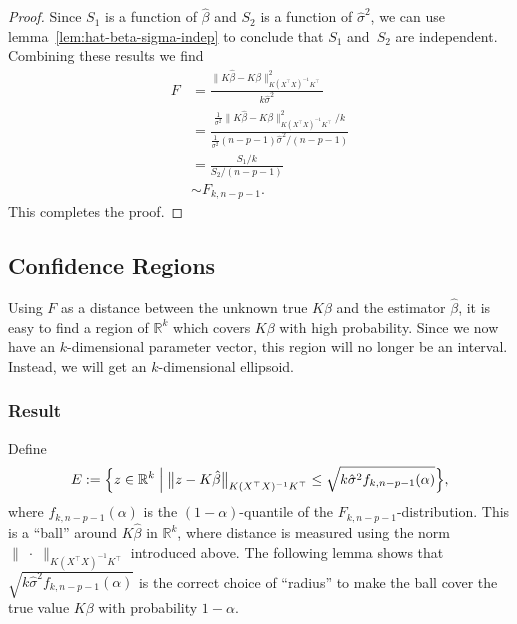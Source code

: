 \documentclass[
  a4paper,
]{article}
\theoremstyle{definition}
\theoremstyle{definition}
\theoremstyle{definition}
\theoremstyle{definition}
\theoremstyle{remark}
\begin{document}
\begin{proof}
Since \(S_1\) is a function of \(\hat\beta\) and \(S_2\) is a function of
\(\hat\sigma^2\), we can use lemma~\ref{lem:hat-beta-sigma-indep} to
conclude that \(S_1\) and~\(S_2\) are independent.
Combining these results we find
\begin{align*}
  F
  &= \frac{\bigl\| K \hat\beta - K \beta \bigr\|_{K(X^\top X)^{-1} K^\top}^2}
          {k \hat\sigma^2} \\
  &= \frac{\frac{1}{\sigma^2} \bigl\| K \hat\beta - K \beta \bigr\|_{K(X^\top X)^{-1} K^\top}^2 / k}
          {\frac{1}{\sigma^2} (n - p - 1) \hat\sigma^2 / (n - p - 1)} \\
  &= \frac{S_1 / k}{S_2 / (n - p - 1)} \\
  &\sim F_{k, n - p - 1}.
\end{align*}
This completes the proof.
\end{proof}

\hypertarget{sec:simult-CI}{%
\subsection{Confidence Regions}\label{sec:simult-CI}}

Using \(F\) as a distance between the unknown true \(K\beta\) and the estimator
\(\hat\beta\), it is easy to find a region of \(\mathbb{R}^k\) which covers \(K\beta\) with
high probability. Since we now have an \(k\)-dimensional parameter vector, this
region will no longer be an interval. Instead, we will get an \(k\)-dimensional
ellipsoid.

\hypertarget{result}{%
\subsubsection{Result}\label{result}}

Define
\begin{equation*}
  E
  := \Bigl\{
      z \in \mathbb{R}^k
    \Bigm|
      \bigl\| z - K \hat\beta \bigr\|_{K(X^\top X)^{-1} K^\top}
        \leq \sqrt{k \hat\sigma^2 f_{k,n-p-1}(\alpha)}
    \Bigr\},
\end{equation*}
where \(f_{k,n-p-1}(\alpha)\) is the \((1-\alpha)\)-quantile of the
\(F_{k,n-p-1}\)-distribution. This is a ``ball'' around \(K\hat\beta\) in \(\mathbb{R}^k\),
where distance is measured using the norm \(\| \;\cdot\; \|_{K(X^\top X)^{-1} K^\top}\) introduced above. The following lemma shows that \(\sqrt{k \hat\sigma^2 f_{k,n-p-1}(\alpha)}\) is the correct choice of ``radius'' to make the
ball cover the true value \(K\beta\) with probability \(1-\alpha\).
\end{document}
